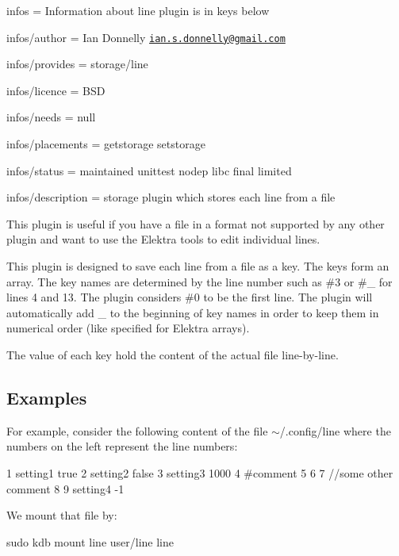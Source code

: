 
\begin{DoxyItemize}
\item infos = Information about line plugin is in keys below
\item infos/author = Ian Donnelly \href{mailto:ian.s.donnelly@gmail.com}{\tt ian.\+s.\+donnelly@gmail.\+com}
\item infos/provides = storage/line
\item infos/licence = B\+SD
\item infos/needs = null
\item infos/placements = getstorage setstorage
\item infos/status = maintained unittest nodep libc final limited
\item infos/description = storage plugin which stores each line from a file
\end{DoxyItemize}

This plugin is useful if you have a file in a format not supported by any other plugin and want to use the Elektra tools to edit individual lines.

This plugin is designed to save each line from a file as a key. The keys form an array. The key names are determined by the line number such as {\ttfamily \#3} or {\ttfamily \#\+\_} for lines 4 and 13. The plugin considers {\ttfamily \#0} to be the first line. The plugin will automatically add {\ttfamily \+\_\+} to the beginning of key names in order to keep them in numerical order (like specified for Elektra arrays).

The value of each key hold the content of the actual file line-\/by-\/line.

\subsection*{Examples}

For example, consider the following content of the file {\ttfamily $\sim$/.config/line} where the numbers on the left represent the line numbers\+:


\begin{DoxyCode}
1  setting1 true
2  setting2 false
3  setting3 1000
4  #comment
5
6
7  //some other comment
8
9  setting4 -1
\end{DoxyCode}


We mount that file by\+:


\begin{DoxyCode}
sudo kdb mount line user/line line
\end{DoxyCode}



